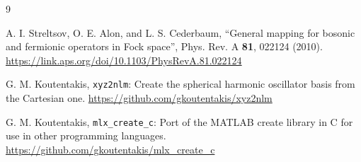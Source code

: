 \documentclass[11pt]{article}
\begin{document}
\begin{thebibliography}{9}

A. I. Streltsov, O. E. Alon, and L. S. Cederbaum,
``General mapping for bosonic and fermionic operators in Fock space'',
Phys. Rev. A \textbf{81}, 022124 (2010).
\url{https://link.aps.org/doi/10.1103/PhysRevA.81.022124}

G. M. Koutentakis,
\texttt{xyz2nlm}: Create the spherical harmonic oscillator basis from the
Cartesian one.
\url{https://github.com/gkoutentakis/xyz2nlm}

G. M. Koutentakis,
\texttt{mlx\_create\_c}: Port of the MATLAB create library in C for use in
other programming languages.
\url{https://github.com/gkoutentakis/mlx_create_c}

\end{thebibliography}
\end{document}
